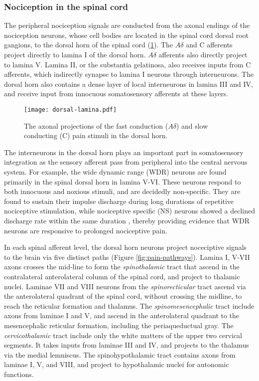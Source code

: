 \subsubsection{Nociception in the spinal cord}

The peripheral nociception signals are conducted from the axonal endings of the nociception neurons, whose cell bodies are located in the spinal cord dorsal root gangions, to the dorsal horn of the spinal cord (\ref{fig:drg}). The $A\delta$ and C afferents project directly to lamina I of the dorsal horn. $A\delta$ afferents also directly project to lamina V. Lamina II, or the substantia gelatinosa, also receives inputs from C afferents, which indirectly synapse to lamina I neurons through interneurons. The dorsal horn also contains a dense layer of local interneurons in lamina III and IV, and receive input from innocuous somatosensory afferents at these layers. 

\begin{figure}[ht]
\texttt{[image: dorsal-lamina.pdf]}
\centering
\caption{The axonal projections of the fast conduction ($ A\delta$) and slow conducting (C) pain stimuli in the dorsal horn.}
\label{fig:drg}
\end{figure}
 
The interneurons in the dorsal horn plays an important part in somatosensory integration as the sensory afferent pass from peripheral into the central nervous system. For example, the wide dynamic range (WDR) neurons are found primarily in the spinal dorsal horn in lamina V-VI. These neurons respond to both innocuous and noxious stimuli, and are decidedly non-specific. They are found to sustain their impulse discharge during long durations of repetitive nociceptive stimulation, while nociceptive specific (NS) neurons showed a declined discharge rate within the same duration \cite{Coghill1993,Maixner1986}, thereby providing evidence that WDR neurons are responsive to prolonged nociceptive pain. 

In each spinal afferent level, the dorsal horn neurons project noceciptive signals to the brain via five distinct paths (Figure \ref{fig:pain-pathways}). Lamina I, V-VII axons crosses the mid-line to form the \textit{spinothalamic} tract that ascend in the contralateral anterolateral column of the spinal cord, and project to thalamic nuclei. Laminae VII and VIII neurons from the \textit{spinorecticular} tract ascend via the anterolateral quadrant of the spinal cord, without crossing the midline, to reach the reticular formation and thalamus. The \textit{spinomesencephalic} tract include axons from laminae I and V, and ascend in the anterolateral quadrant to the mesencephalic reticular formation, including the periaqueductual gray. The \textit{cervicothalamic} tract include only the white matters of the upper two cervical segments. It takes inputs from laminae III and IV, and projects to the thalamus via the medial lemniscus. The spinohypothalamic tract contains axons from laminae I, V, and VIII, and project to hypothalamic nuclei for autonomic functions. 

